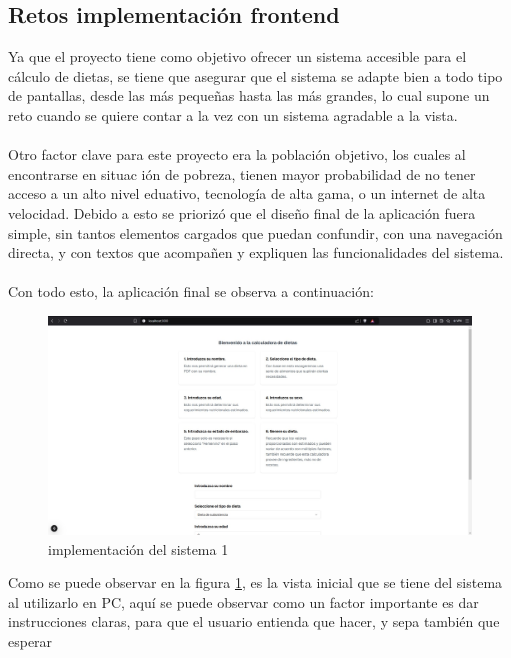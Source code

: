 \subsection{Retos implementaci\'on frontend} 
\noindent Ya que el proyecto tiene como objetivo ofrecer un sistema accesible para el c\'alculo de dietas, se tiene que asegurar que el sistema se adapte bien a todo tipo de pantallas, desde las m\'as peque\~{n}as hasta las m\'as grandes, lo cual supone un reto cuando se quiere contar a la vez con un sistema agradable a la vista. 
\\
\\
Otro factor clave para este proyecto era la poblaci\'on objetivo, los cuales al encontrarse en situac i\'on de pobreza, tienen mayor probabilidad de no tener acceso a un alto nivel eduativo, tecnolog\'ia de alta gama, o un internet de alta velocidad. Debido a esto se prioriz\'o que el dise\~no final de la aplicaci\'on fuera simple, sin tantos elementos cargados que puedan confundir, con una navegaci\'on directa, y con textos que acompa\~nen y expliquen las funcionalidades del sistema.
\\
\\
Con todo esto,  la aplicaci\'on final se observa a continuaci\'on:


\begin{figure}[H]
    \centering
    \includegraphics[width=15cm]{img/implementacion/implementacion.jpeg}
    \caption{implementaci\'on del sistema 1}
    \label{fig:implementacion1}
\end{figure}

Como se puede observar en la figura \ref{fig:implementacion1}, es la vista inicial que se tiene del sistema al utilizarlo en PC, aqu\'i se puede observar como un factor importante es dar instrucciones claras, para que el usuario entienda que hacer, y sepa tambi\'en que esperar

